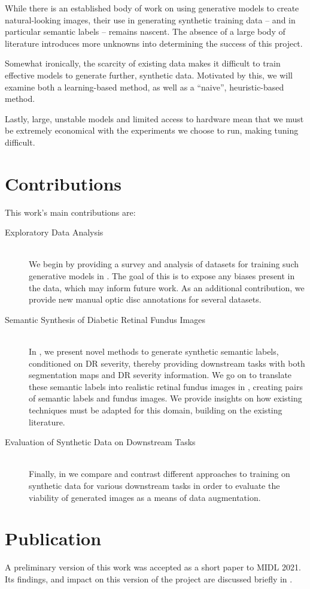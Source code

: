 While there is an established body of work on using generative models to create natural-looking images, their use in generating synthetic training data -- and in particular semantic labels -- remains nascent.
The absence of a large body of literature introduces more unknowns into determining the success of this project.

Somewhat ironically, the scarcity of existing data makes it difficult to train effective models to generate further, synthetic data.
Motivated by this, we will examine both a learning-based method, as well as a ``naive'', heuristic-based method.

Lastly, large, unstable models and limited access to hardware mean that we must be extremely economical with the experiments we choose to run, making tuning difficult.

\section{Contributions}

This work's main contributions are:

\begin{description}
    \item[Exploratory Data Analysis] \hfill \\
    We begin by providing a survey and analysis of datasets for training such generative models in .
    The goal of this is to expose any biases present in the data, which may inform future work.
    As an additional contribution, we provide new manual optic disc annotations for several datasets.
    
    \item[Semantic Synthesis of Diabetic Retinal Fundus Images] \hfill \\
    In , we present novel methods to generate synthetic semantic labels, conditioned on DR severity, thereby providing downstream tasks with both segmentation maps and DR severity information.
    We go on to translate these semantic labels into realistic retinal fundus images in , creating pairs of semantic labels and fundus images.
    We provide insights on how existing techniques must be adapted for this domain, building on the existing literature.
    
    \item[Evaluation of Synthetic Data on Downstream Tasks] \hfill \\
    Finally, in  we compare and contrast different approaches to training on synthetic data for various downstream tasks in order to evaluate the viability of generated images as a means of data augmentation.
\end{description}

\section{Publication}
 
A preliminary version of this work was accepted as a short paper to MIDL 2021.
Its findings, and impact on this version of the project are discussed briefly in .